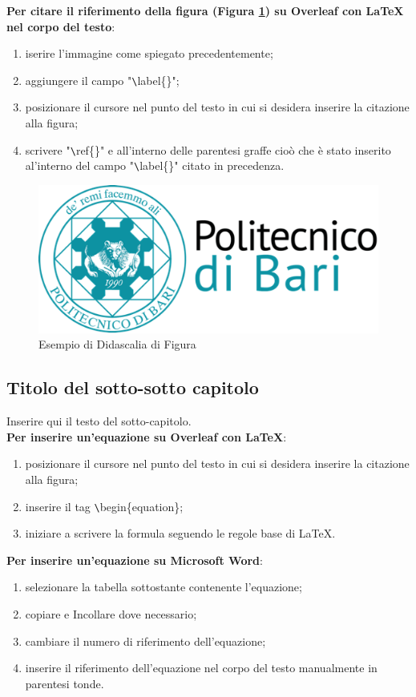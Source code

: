 \noindent \textbf{Per citare il riferimento della figura (Figura \ref{tab:esempio-immagine}) su Overleaf con LaTeX nel corpo del testo}:
\begin{enumerate}
    \item iserire l'immagine come spiegato precedentemente;
    \item aggiungere il campo "\verb|\|label\{\}";
    \item posizionare il cursore nel punto del testo in cui si desidera inserire la citazione alla figura;
    \item scrivere "\verb|\|ref\{\}" e all'interno delle parentesi graffe cioò che è stato inserito al'interno del campo "\verb|\|label\{\}" citato in precedenza.
\end{enumerate}


\begin{figure}[H]
    \centering
    \includegraphics[width=0.7\linewidth]{images/logo-politecnico-di-bari-esteso.png}
    \caption{Esempio di Didascalia di Figura}
    \label{tab:esempio-immagine}
\end{figure}


\subsection{Titolo del sotto-sotto capitolo}
Inserire qui il testo del sotto-capitolo.\\

\noindent \textbf{Per inserire un'equazione su Overleaf con LaTeX}:
\begin{enumerate}
    \item posizionare il cursore nel punto del testo in cui si desidera inserire la citazione alla figura;
    \item inserire il tag \verb|\|begin\{equation\};
    \item iniziare a scrivere la formula seguendo le regole base di LaTeX.
\end{enumerate}

\noindent \textbf{Per inserire un'equazione su Microsoft Word}: 
\begin{enumerate}
    \item selezionare la tabella sottostante contenente l’equazione;
    \item copiare e Incollare dove necessario;
    \item cambiare il numero di riferimento dell’equazione;
    \item inserire il riferimento dell’equazione nel corpo del testo manualmente in parentesi tonde.
\end{enumerate}


